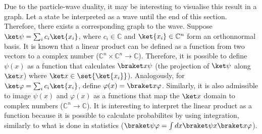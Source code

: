 Due to the particle-wave duality,
it may be interesting to visualise this result in a graph.
Let a state be interpreted as a wave until the end of this section.
Therefore, there exists a corresponding graph to the wave.
Suppose $\ket \psi = \sum_i c_i \ket{x_i}$,
where $c_i \in \mathbb{C}$ and $\ket{x_i} \in \mathbb{C}^n$ form an orthonnormal basis.
It is known that a linear product can be defined as a function
from two vectors to a complex number
($\mathbb{C}^n \times \mathbb{C}^n \rightarrow \mathbb{C}$).
Therefore, it is possible to define $\psi(x)$ as a function that calculates $\braket x \psi$
(the projection of $\ket \psi$ along $\ket x$) where $\ket x \in \set{\ket{x_i}}$).
Analogously, for $\ket \varphi = \sum_i c_i \ket{x_i}$, define
$\varphi(x) = \braket x \varphi$.
Similarly, it is also admissible to image $\psi(x)$ and $\varphi(x)$ as a functions that
map the $\ket x$ domain to complex numbers ($\mathbb{C}^n \rightarrow \mathbb{C}$).
It is interesting to interpret the linear product as a function because
it is possible to calculate probabilites by using integration,
similarly to what is done in statistics
($\braket \psi \varphi = \int dx \braket \psi x \braket x \varphi$).

